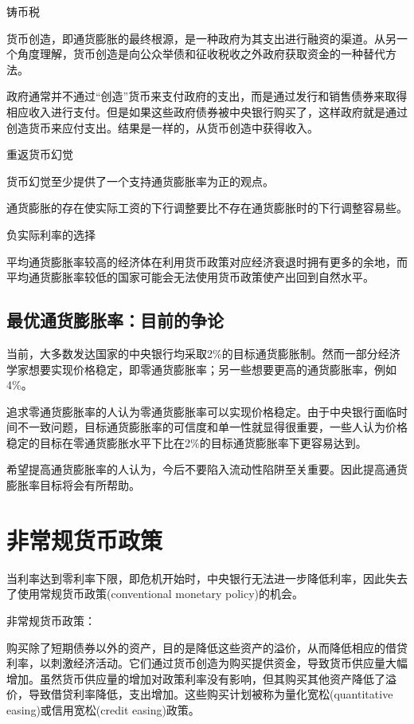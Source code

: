 \documentclass{article}
\begin{document}
铸币税

货币创造，即通货膨胀的最终根源，是一种政府为其支出进行融资的渠道。从另一个角度理解，货币创造是向公众举债和征收税收之外政府获取资金的一种替代方法。

政府通常并不通过“创造”货币来支付政府的支出，而是通过发行和销售债券来取得相应收入进行支付。但是如果这些政府债券被中央银行购买了，这样政府就是通过创造货币来应付支出。结果是一样的，从货币创造中获得收入。

\hspace*{\fill}

重返货币幻觉

货币幻觉至少提供了一个支持通货膨胀率为正的观点。

通货膨胀的存在使实际工资的下行调整要比不存在通货膨胀时的下行调整容易些。

\hspace*{\fill}

负实际利率的选择

平均通货膨胀率较高的经济体在利用货币政策对应经济衰退时拥有更多的余地，而平均通货膨胀率较低的国家可能会无法使用货币政策使产出回到自然水平。

\subsection{最优通货膨胀率：目前的争论}

当前，大多数发达国家的中央银行均采取2\%的目标通货膨胀制。然而一部分经济学家想要实现价格稳定，即零通货膨胀率；另一些想要更高的通货膨胀率，例如4\%。

追求零通货膨胀率的人认为零通货膨胀率可以实现价格稳定。由于中央银行面临时间不一致问题，目标通货膨胀率的可信度和单一性就显得很重要，一些人认为价格稳定的目标在零通货膨胀水平下比在2\%的目标通货膨胀率下更容易达到。

希望提高通货膨胀率的人认为，今后不要陷入流动性陷阱至关重要。因此提高通货膨胀率目标将会有所帮助。


\section{非常规货币政策}

当利率达到零利率下限，即危机开始时，中央银行无法进一步降低利率，因此失去了使用常规货币政策(conventional monetary policy)的机会。

非常规货币政策：

购买除了短期债券以外的资产，目的是降低这些资产的溢价，从而降低相应的借贷利率，以刺激经济活动。它们通过货币创造为购买提供资金，导致货币供应量大幅增加。虽然货币供应量的增加对政策利率没有影响，但其购买其他资产降低了溢价，导致借贷利率降低，支出增加。这些购买计划被称为量化宽松(quantitative easing)或信用宽松(credit easing)政策。
\end{document}
